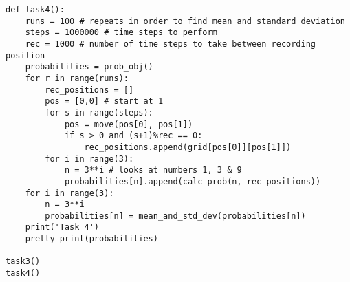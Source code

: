 \documentclass[11pt, a4paper, onecolumn]{article}
\begin{document}
\begin{lstlisting}
def task4():
    runs = 100 # repeats in order to find mean and standard deviation
    steps = 1000000 # time steps to perform
    rec = 1000 # number of time steps to take between recording position
    probabilities = prob_obj()
    for r in range(runs):
        rec_positions = []
        pos = [0,0] # start at 1
        for s in range(steps):
            pos = move(pos[0], pos[1])
            if s > 0 and (s+1)%rec == 0:
                rec_positions.append(grid[pos[0]][pos[1]])
        for i in range(3):
            n = 3**i # looks at numbers 1, 3 & 9
            probabilities[n].append(calc_prob(n, rec_positions))
    for i in range(3):
        n = 3**i
        probabilities[n] = mean_and_std_dev(probabilities[n])
    print('Task 4')
    pretty_print(probabilities)

task3()
task4()
\end{lstlisting}
\end{document}
